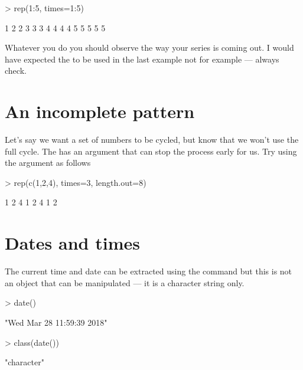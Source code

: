 \begin{Schunk}
\begin{Sinput}
> rep(1:5, times=1:5) 
\end{Sinput}
\begin{Soutput}
 [1] 1 2 2 3 3 3 4 4 4 4 5 5 5 5 5
\end{Soutput}
\end{Schunk}

Whatever you do you should observe the way your series is coming out. I would have expected the  to be used in the last example not  for example --- always check. 
 
\section{An incomplete pattern} 
 
Let's say we want a set of numbers to be cycled, but know that we won't use the full cycle. The  has an argument that can stop the process early for us. Try using the  argument as follows 

\begin{Schunk}
\begin{Sinput}
> rep(c(1,2,4), times=3, length.out=8) 
\end{Sinput}
\begin{Soutput}
[1] 1 2 4 1 2 4 1 2
\end{Soutput}
\end{Schunk}

 
 
\section{Dates and times} 
 
The current time and date can be extracted using the  command but this is not an object that can be manipulated --- it is a character string only. 

\begin{Schunk}
\begin{Sinput}
> date() 
\end{Sinput}
\begin{Soutput}
[1] "Wed Mar 28 11:59:39 2018"
\end{Soutput}
\begin{Sinput}
> class(date()) 
\end{Sinput}
\begin{Soutput}
[1] "character"
\end{Soutput}
\end{Schunk}

